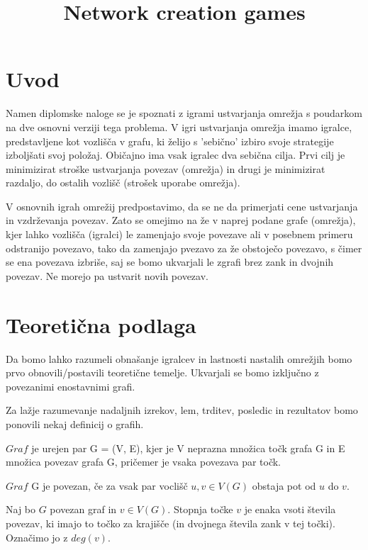 \documentclass[fin1, tisk]{fmfdelo}
\title{Network creation games}
\begin{document}
\section{Uvod}

Namen diplomske naloge se je spoznati z igrami ustvarjanja omrežja s poudarkom na dve osnovni verziji tega problema.
V igri ustvarjanja omrežja imamo igralce, predstavljene kot vozlišča v grafu, ki želijo s 'sebično' izbiro svoje
strategije izboljšati svoj položaj. Običajno ima vsak igralec dva sebična cilja. Prvi cilj je minimizirat stroške
ustvarjanja povezav (omrežja) in drugi je minimizirat razdaljo, do ostalih vozlišč (strošek uporabe omrežja).


V osnovnih igrah omrežij predpostavimo, da se ne da primerjati cene ustvarjanja in vzdrževanja povezav. Zato se
omejimo na že v naprej podane grafe (omrežja), kjer lahko vozlišča (igralci) le zamenjajo svoje povezave ali v
posebnem primeru odstranijo povezavo, tako da zamenjajo pvezavo za že obstoječo povezavo, s čimer se ena povezava
izbriše, saj se bomo ukvarjali le zgrafi brez zank in dvojnih povezav. Ne morejo pa ustvarit novih povezav.

\section{Teoretična podlaga}
Da bomo lahko razumeli obnašanje igralcev in lastnosti nastalih omrežjih bomo prvo obnovili/postavili teoretične temelje. 
Ukvarjali se bomo izključno z povezanimi enostavnimi grafi.

Za lažje razumevanje nadaljnih izrekov, lem, trditev, posledic in rezultatov bomo ponovili nekaj definicij o grafih.

\begin{definicija}
$Graf$ je urejen par G = (V, E), kjer je V neprazna množica točk grafa G in E množica povezav grafa G, pričemer je vsaka povezava par točk.
\end{definicija}

\begin{definicija}
$Graf$ G je povezan, če za vsak par voclišč $u, v \in V(G)$ obstaja pot od $u$ do $v$.
\end{definicija}

\begin{definicija}
Naj bo $G$ povezan graf in $v \in V(G)$. Stopnja točke $v$ je enaka vsoti števila povezav, ki imajo to točko za krajišče (in dvojnega števila zank v tej točki).
Označimo jo z $deg(v)$.
\end{definicija}
\end{document}
